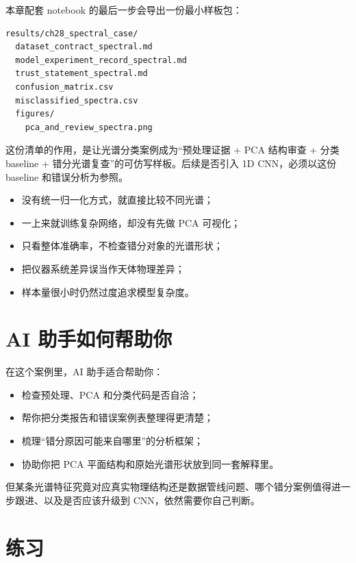 本章配套 notebook 的最后一步会导出一份最小样板包：

\begin{examplebox}
\begin{lstlisting}[style=terminal]
results/ch28_spectral_case/
  dataset_contract_spectral.md
  model_experiment_record_spectral.md
  trust_statement_spectral.md
  confusion_matrix.csv
  misclassified_spectra.csv
  figures/
    pca_and_review_spectra.png
\end{lstlisting}
\end{examplebox}

这份清单的作用，是让光谱分类案例成为“预处理证据 + PCA 结构审查 + 分类 baseline + 错分光谱复查”的可仿写样板。后续是否引入 1D CNN，必须以这份 baseline 和错误分析为参照。

\begin{warnbox}[光谱分类中的常见误区]
\begin{itemize}
    \item 没有统一归一化方式，就直接比较不同光谱；
    \item 一上来就训练复杂网络，却没有先做 PCA 可视化；
    \item 只看整体准确率，不检查错分对象的光谱形状；
    \item 把仪器系统差异误当作天体物理差异；
    \item 样本量很小时仍然过度追求模型复杂度。
\end{itemize}
\end{warnbox}

\section{AI 助手如何帮助你}

在这个案例里，AI 助手适合帮助你：

\begin{itemize}
    \item 检查预处理、PCA 和分类代码是否自洽；
    \item 帮你把分类报告和错误案例表整理得更清楚；
    \item 梳理“错分原因可能来自哪里”的分析框架；
    \item 协助你把 PCA 平面结构和原始光谱形状放到同一套解释里。
\end{itemize}

但某条光谱特征究竟对应真实物理结构还是数据管线问题、哪个错分案例值得进一步跟进、以及是否应该升级到 CNN，依然需要你自己判断。

\section{练习}

